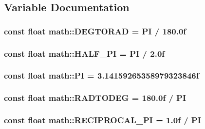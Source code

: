 \subsection{Variable Documentation}
\hypertarget{namespacemath_a587d3c31fcbb87c5ccd1d9bb53a001ab}{
\subsubsection[{D\-E\-G\-T\-O\-R\-A\-D}]{\setlength{\rightskip}{0pt plus 5cm}const float math\-::\-D\-E\-G\-T\-O\-R\-A\-D = {\bf P\-I} / 180.\-0f\hspace{0.3cm}{\ttfamily [static]}}}\label{namespacemath_a587d3c31fcbb87c5ccd1d9bb53a001ab}
\hypertarget{namespacemath_ab0c0d4b652877ea23c84cbd2ceaba14f}{
\subsubsection[{H\-A\-L\-F\-\_\-\-P\-I}]{\setlength{\rightskip}{0pt plus 5cm}const float math\-::\-H\-A\-L\-F\-\_\-\-P\-I = {\bf P\-I} / 2.\-0f\hspace{0.3cm}{\ttfamily [static]}}}\label{namespacemath_ab0c0d4b652877ea23c84cbd2ceaba14f}
\hypertarget{namespacemath_a6bc2e46a09ced59adc7ca762c21672e9}{
\subsubsection[{P\-I}]{\setlength{\rightskip}{0pt plus 5cm}const float math\-::\-P\-I = 3.\-14159265358979323846f\hspace{0.3cm}{\ttfamily [static]}}}\label{namespacemath_a6bc2e46a09ced59adc7ca762c21672e9}
\hypertarget{namespacemath_a16c58a21197921edbdf61706b7520088}{
\subsubsection[{R\-A\-D\-T\-O\-D\-E\-G}]{\setlength{\rightskip}{0pt plus 5cm}const float math\-::\-R\-A\-D\-T\-O\-D\-E\-G = 180.\-0f / P\-I\hspace{0.3cm}{\ttfamily [static]}}}\label{namespacemath_a16c58a21197921edbdf61706b7520088}
\hypertarget{namespacemath_a4ec943d35c300759d313db7a5c9a28ca}{
\subsubsection[{R\-E\-C\-I\-P\-R\-O\-C\-A\-L\-\_\-\-P\-I}]{\setlength{\rightskip}{0pt plus 5cm}const float math\-::\-R\-E\-C\-I\-P\-R\-O\-C\-A\-L\-\_\-\-P\-I = 1.\-0f / P\-I\hspace{0.3cm}{\ttfamily [static]}}}\label{namespacemath_a4ec943d35c300759d313db7a5c9a28ca}
